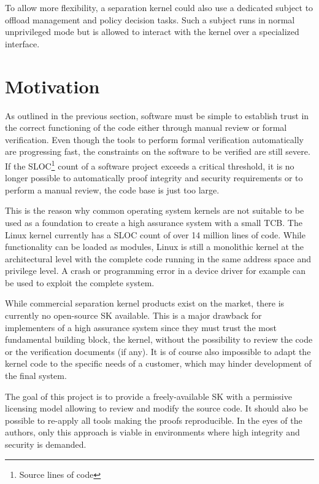 To allow more flexibility, a separation kernel could also use a dedicated
subject to offload management and policy decision tasks. Such a subject runs in
normal unprivileged mode but is allowed to interact with the kernel over a
specialized interface.

\section{Motivation}
As outlined in the previous section, software must be simple to establish trust
in the correct functioning of the code either through manual review or formal
verification. Even though the tools to perform formal verification
automatically are progressing fast, the constraints on the software to be
verified are still severe. If the SLOC\footnote{Source lines of
code} count of a software project exceeds a critical threshold, it
is no longer possible to automatically proof integrity and security
requirements or to perform a manual review, the code base is just too large.

This is the reason why common operating system kernels are not suitable to be
used as a foundation to create a high assurance system with a small TCB. The
Linux kernel currently has a SLOC count of over 14 million lines
of code. While functionality can be loaded as modules, Linux is still a
monolithic kernel at the architectural level with the complete code running in
the same address space and privilege level. A crash or programming error in a
device driver for example can be used to exploit the complete system.

While commercial separation kernel products exist on the market, there is
currently no open-source SK available. This is a major drawback for
implementers of a high assurance system since they must trust the most
fundamental building block, the kernel, without the possibility to review the
code or the verification documents (if any). It is of course also impossible to
adapt the kernel code to the specific needs of a customer, which may hinder
development of the final system.

The goal of this project is to provide a freely-available SK with a permissive
licensing model allowing to review and modify the source code.
It should also be possible to re-apply all tools making the proofs
reproducible. In the eyes of the authors, only this approach is viable in
environments where high integrity and security is demanded.

